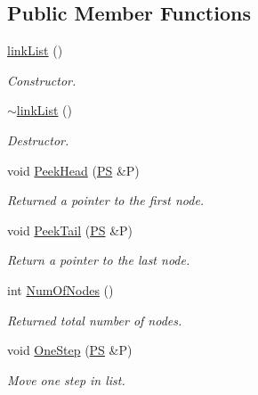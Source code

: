 \subsection*{Public Member Functions}
\begin{DoxyCompactItemize}
\item 
\hyperlink{classlink_list_a2b2193978ecc7fa7a28d194239402fcc}{linkList} ()
\begin{DoxyCompactList}\small\item\em Constructor. \item\end{DoxyCompactList}\item 
\hyperlink{classlink_list_a0b120ae1c3c93e3d0d3fe32b704bb6a1}{$\sim$linkList} ()
\begin{DoxyCompactList}\small\item\em Destructor. \item\end{DoxyCompactList}\item 
void \hyperlink{classlink_list_a7a7cc9e8690c7e9c73d5b406cae066d3}{PeekHead} (\hyperlink{structlink_list_1_1_snode}{PS} \&P)
\begin{DoxyCompactList}\small\item\em Returned a pointer to the first node. \item\end{DoxyCompactList}\item 
void \hyperlink{classlink_list_a54c57c0f1491cca11b810c658d386c3a}{PeekTail} (\hyperlink{structlink_list_1_1_snode}{PS} \&P)
\begin{DoxyCompactList}\small\item\em Return a pointer to the last node. \item\end{DoxyCompactList}\item 
int \hyperlink{classlink_list_aee3f890e4e8f48db1518e5114d5bcca8}{NumOfNodes} ()
\begin{DoxyCompactList}\small\item\em Returned total number of nodes. \item\end{DoxyCompactList}\item 
void \hyperlink{classlink_list_a2b549aa4a51e457cb8e0ef19e35978f3}{OneStep} (\hyperlink{structlink_list_1_1_snode}{PS} \&P)
\begin{DoxyCompactList}\small\item\em Move one step in list. \item\end{DoxyCompactList}\item 

\end{DoxyCompactItemize}
